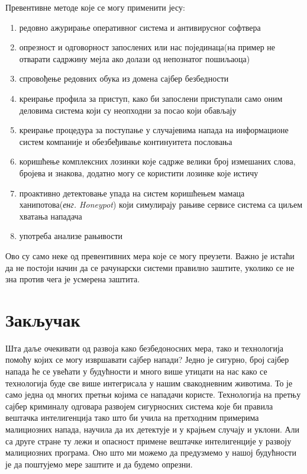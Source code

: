 \documentclass[a4paper]{article}
\begin{document}
	Превентивне методе које се могу применити јесу\cite{zastita1}\cite{zastita2}:
	\begin{enumerate}
		\item редовно ажурирање оперативног система и антивирусног софтвера
		\item опрезност и одговорност запослених или нас појединаца(на пример не отварати садржину мејла ако долази од непознатог пошиљаоца)
		\item спровођење редовних обука из домена сајбер безбедности 
		\item креирање профила за приступ, како би запослени приступали само оним деловима система који су неопходни за посао који обављају 
		\item креирање процедура за поступање у случајевима напада на инфор\-мационе систем компаније и обезбеђивање континуитета пословања 
		\item коришћење комплексних лозинки које садрже велики број измеша\-них слова, бројева и знакова, додатно могу се користити лозинке које истичу 			
		\item проактивно детектовање упада на систем коришћењем мамаца ханипотова({\em енг. Honeypot})\cite{hanipot} који симулирају рањиве сервисе система са циљем хватања нападача 
		\item употреба анализе рањивости 
	\end{enumerate}
	
	Ово су само неке од превентивних мера које се могу преузети. Важно је истаћи да не постоји начин да се рачунарски системи правилно заштите, уколико се не зна против чега је усмерена заштита.
	\section{Закључак}
	\label{sec:Zakljucak}
	Шта даље очекивати од развоја како безбедоносних мера, тако и технологија помоћу којих се могу извршавати сајбер напади? Једно је сигурно, број сајбер напада ће се увећати у будућности и много више утицати на нас како се технологија буде све више интегрисала у нашим свакодневним животима. То је само једна од многих претњи којима се нападачи користе. Технологија на претњу сајбер криминалу одговара развојем сигурносних система које би правила вештачка интелигенција тако што би учила на претходним примерима малициозних напада, научила да их детектује и у крајњем случају и уклони\cite{AIsecurity}. Али са друге стране ту лежи и опасност примене вештачке интелигенције у развоју малициозних програма. Оно што ми можемо да предузмемо у нашој будућности је да поштујемо мере заштите и да будемо опрезни. 
\end{document}
